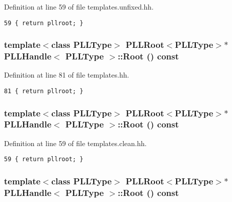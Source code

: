 Definition at line 59 of file templates.unfixed.hh.



\footnotesize\begin{verbatim}59 { return pllroot; } 
\end{verbatim}\normalsize 
{}
\subsubsection{\setlength{\rightskip}{0pt plus 5cm}template$<$class PLLType$>$ {\bf PLLRoot}$<${\bf PLLType}$>$$\ast$ PLLHandle$<$ {\bf PLLType} $>$::Root () const\hspace{0.3cm}{\tt  [inline]}}\label{classPLLHandle_a26}




Definition at line 81 of file templates.hh.



\footnotesize\begin{verbatim}81 { return pllroot; } 
\end{verbatim}\normalsize 
{}
\subsubsection{\setlength{\rightskip}{0pt plus 5cm}template$<$class PLLType$>$ {\bf PLLRoot}$<${\bf PLLType}$>$$\ast$ PLLHandle$<$ {\bf PLLType} $>$::Root () const\hspace{0.3cm}{\tt  [inline]}}\label{classPLLHandle_a13}




Definition at line 59 of file templates.clean.hh.



\footnotesize\begin{verbatim}59 { return pllroot; } 
\end{verbatim}\normalsize 
{}
\subsubsection{\setlength{\rightskip}{0pt plus 5cm}template$<$class PLLType$>$ {\bf PLLRoot}$<${\bf PLLType}$>$$\ast$ PLLHandle$<$ {\bf PLLType} $>$::Root () const\hspace{0.3cm}{\tt  [inline]}}\label{classPLLHandle_a0}




